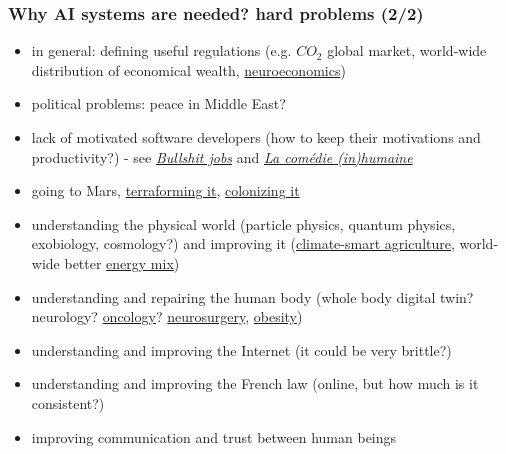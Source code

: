 \documentclass[xcolor=svgnames,final,smaller,a4]{beamer}
\begin{document}
 
 \begin{frame}
   \frametitle{Why AI systems are needed? hard problems (2/2)}

   \begin{itemize}
   \item in general: defining useful regulations (e.g. $CO_2$ global
     market, world-wide distribution of economical wealth,
     \href{https://en.wikipedia.org/wiki/Neuroeconomics}{neuroeconomics})
   \item political problems: peace in Middle East?
   \item lack of motivated software developers (how to keep their
     motivations and productivity?) - see \href{https://en.wikipedia.org/wiki/Bullshit_Jobs}{\textit{Bullshit jobs}} and \href{https://www.editions-observatoire.com/content/La_comédie_inhumaine}{\textit{La comédie (in)humaine}}
   \item going to Mars, \href{https://en.wikipedia.org/wiki/Terraforming\_of\_Mars}{terraforming it}, \href{https://en.wikipedia.org/wiki/Colonization_of_Mars}{colonizing it}
   \item understanding the physical world (particle physics, quantum
     physics, exobiology, cosmology?) and improving it
     (\href{https://en.wikipedia.org/wiki/Climate-smart_agriculture}{climate-smart
       agriculture}, world-wide better
     \href{https://en.wikipedia.org/wiki/Energy\_mix}{energy mix})
   \item understanding and repairing the human body (whole body
     digital twin? neurology?
     \href{https://en.wikipedia.org/wiki/Oncology}{oncology}?
     \href{https://en.wikipedia.org/wiki/Neurosurgery}{neurosurgery}, \href{https://en.wikipedia.org/wiki/Obesity}{obesity})
     \item understanding and improving the Internet (it could be very
       brittle?)
     \item understanding and improving the French law (online, but how much is it consistent?)
     \item improving communication and trust between human beings
   \end{itemize}

 \end{frame}
 
\end{document}
